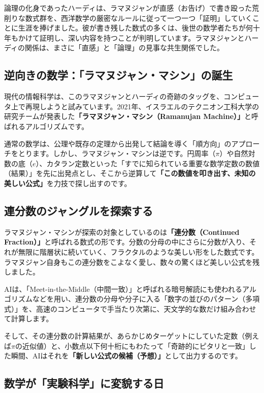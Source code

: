 論理の化身であったハーディは、ラマヌジャンが直感（お告げ）で書き殴った荒削りな数式群を、西洋数学の厳密なルールに従って一つ一つ「証明」していくことに生涯を捧げました。彼が書き残した数式の多くは、後世の数学者たちが何十年もかけて証明し、深い内容を持つことが判明しています。ラマヌジャンとハーディの関係は、まさに「直感」と「論理」の見事な共生関係でした。

\subsection{逆向きの数学：「ラマヌジャン・マシン」の誕生}

現代の情報科学は、このラマヌジャンとハーディの奇跡のタッグを、コンピュータ上で再現しようと試みています。2021年、イスラエルのテクニオン工科大学の研究チームが発表した\textbf{「ラマヌジャン・マシン（Ramanujan Machine）」}と呼ばれるアルゴリズムです。

通常の数学は、公理や既存の定理から出発して結論を導く「順方向」のアプローチをとります。しかし、ラマヌジャン・マシンは逆です。円周率（\(\pi\)）や自然対数の底（\(e\)）、カタラン定数といった「すでに知られている重要な数学定数の数値（結果）」を先に出発点とし、そこから逆算して\textbf{「この数値を叩き出す、未知の美しい公式」}を力技で探し出すのです。

\subsection{連分数のジャングルを探索する}

ラマヌジャン・マシンが探索の対象としているのは\textbf{「連分数（Continued Fraction）」}と呼ばれる数式の形です。分数の分母の中にさらに分数が入り、それが無限に階層状に続いていく、フラクタルのような美しい形をした数式です。ラマヌジャン自身もこの連分数をこよなく愛し、数々の驚くほど美しい公式を残しました。

AIは、「Meet-in-the-Middle（中間一致）」と呼ばれる暗号解読にも使われるアルゴリズムなどを用い、連分数の分母や分子に入る「数字の並びのパターン（多項式）」を、高速のコンピュータで手当たり次第に、天文学的な数だけ組み合わせて計算します。

そして、その連分数の計算結果が、あらかじめターゲットにしていた定数（例えば\(\pi\)の近似値）と、小数点以下何十桁にもわたって「奇跡的にピタリと一致」した瞬間、AIはそれを\textbf{「新しい公式の候補（予想）」}として出力するのです。

\subsection{数学が「実験科学」に変貌する日}

